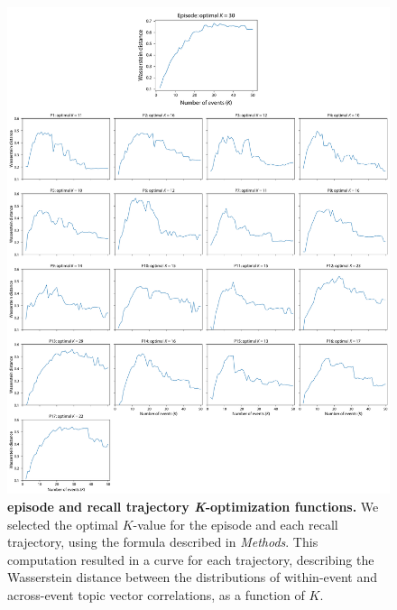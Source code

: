 \documentclass{article}
\begin{document}
\begin{figure}[p!]
\centering
\includegraphics[width=.9\textwidth]{figs/k_optimization}
\caption{\small \textbf{episode and recall trajectory \textit{K}-optimization functions.}  We selected the optimal $K$-value for the episode and each recall trajectory, using the formula described in \textit{Methods}. This computation resulted in a curve for each trajectory, describing the Wasserstein distance between the distributions of within-event and across-event topic vector correlations, as a function of $K$.}
\label{fig:k_optimization}
\end{figure}

\FloatBarrier

\newpage
\renewcommand{\refname}{Supplemental references}
% 

\end{document}
